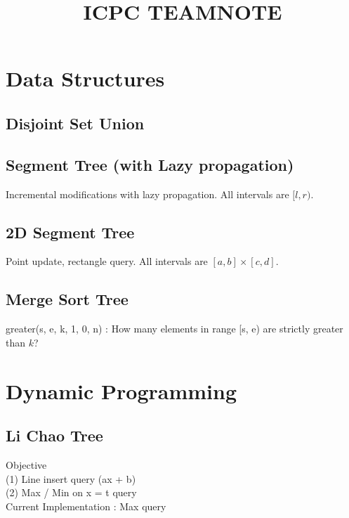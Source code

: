 \documentclass[landscape]{article}
\title{\Huge{\textsf{ICPC TEAMNOTE}}}
\author{}
\date{ }
\begin{document}
\newpage
\begin{multicols}{2}\raggedcolumns
    \tableofcontents
    \pagebreak
\end{multicols}
\begin{multicols}{3 }\raggedcolumns


\section{Data Structures}
    \subsection{Disjoint Set Union}
        
    \subsection{Segment Tree (with Lazy propagation)}
        Incremental modifications with lazy propagation. All intervals are $[l, r)$.
        
    \subsection{2D Segment Tree}
        Point update, rectangle query. All intervals are $[a, b] \times [c, d]$.
        
    \subsection{Merge Sort Tree}
        greater(s, e, k, 1, 0, n) : How many elements in range [s, e) are strictly greater than $k$?
        


\section{Dynamic Programming}
    \subsection{Li Chao Tree}
        Objective\\
        (1) Line insert query (ax + b)\\
        (2) Max / Min on x = t query\\
        Current Implementation : Max query\\
        


\end{multicols}
\end{document}
